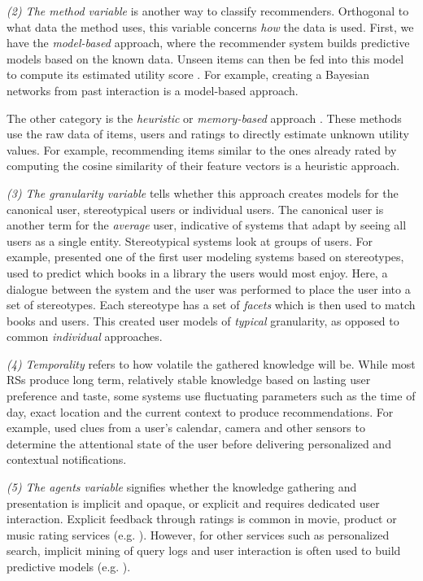 \emph{(2) The method variable} is another way to classify recommenders. Orthogonal to what data the method uses, this variable
concerns \emph{how} the data is used.
First, we have the \emph{model-based} approach, where the recommender system builds predictive models based on the known data. 
Unseen items can then be fed into this model to compute its estimated utility score
\cite[p.5]{Adomavicius2005}. 
For example, creating a Bayesian networks from past interaction is a model-based approach.

The other category is the \emph{heuristic} or \emph{memory-based} approach \cite[p.5]{Adomavicius2005}. 
These methods use the raw data of items, users and ratings to directly estimate unknown utility values. 
For example, recommending items similar to the ones already rated by computing the cosine similarity of their feature vectors is a heuristic approach.

\emph{(3) The granularity variable} tells whether this approach creates models for the canonical user, stereotypical users or individual users. 
The canonical user is another term for the \emph{average} user, indicative of systems that adapt by seeing all users as a single entity. 
Stereotypical systems look at groups of users. 
For example, \cite{Rich1979} presented one of the first user modeling systems based on stereotypes, 
used to predict which books in a library the users would most enjoy.
Here, a dialogue between the system and the user was performed to place the user into a set of stereotypes. 
Each stereotype has a set of \emph{facets} which is then used to match books and users.
This created user models of \emph{typical} granularity, as opposed to common \emph{individual} approaches.

\emph{(4) Temporality} refers to how volatile the gathered knowledge will be.
While most RSs produce long term, relatively stable knowledge based on lasting user preference and taste, 
some systems use fluctuating parameters such as the time of day, exact location and the current context to produce recommendations.
For example, \cite{Horvitz} used clues from a user's calendar, camera and other sensors to determine the attentional state
of the user before delivering personalized and contextual notifications.

\emph{(5) The agents variable} signifies whether the knowledge gathering and presentation is implicit and opaque, 
or explicit and requires dedicated user interaction. Explicit feedback through ratings is 
common in movie, product or music rating services (e.g. \cite{Bell2007, Basu1998, Hotho}). 
However, for other services such as personalized search,
implicit mining of query logs and user interaction is often used to build predictive models 
(e.g. \cite{Shen2005, Agichtein2006, Speretta2000, Teevan2005}).



